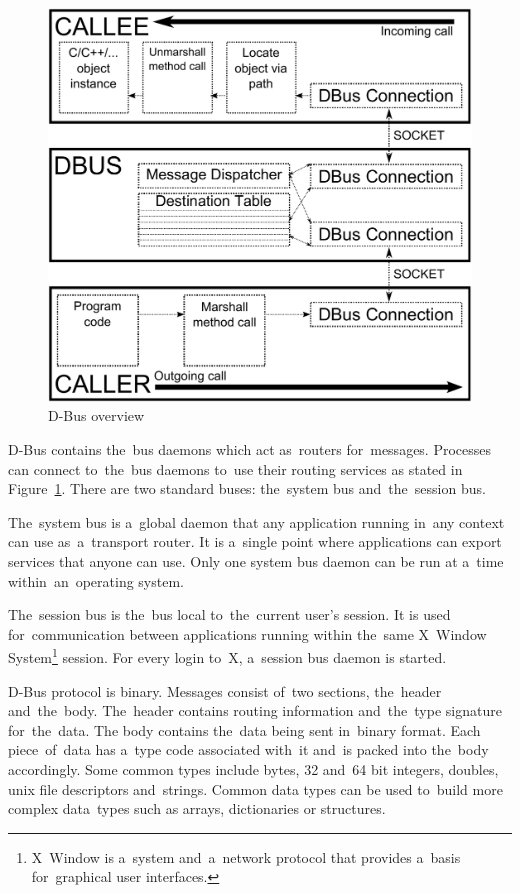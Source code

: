 \documentclass[conference]{IEEEtran}
\begin{document}
\begin{figure}[h]
\centering
\includegraphics[width=\columnwidth]{dbus_overview.pdf}
\caption{D-Bus overview}
\label{fig:dbus_image}
\end{figure}


D-Bus contains the~bus daemons which act as~routers for~messages. Processes
can connect to~the~bus daemons to~use their routing services as stated
in Figure~\ref{fig:dbus_image}. There are two standard buses:
the~system bus and~the~session bus.


The~system bus is a~global daemon that any application running in~any
context can use as~a~transport router. It is a~single point where applications
can export services that anyone can use. Only one system bus daemon
can be run at a~time within~an~operating system.


The~session bus is the~bus local to~the~current user's session. It is used
for~communication between applications running within the~same X~Window
System\footnote{X~Window is a~system and~a~network protocol that provides
a~basis for~graphical user interfaces.} session. For every login to~X,
a~session bus daemon is started.


D-Bus protocol is binary. Messages consist of~two sections, the~header
and~the~body. The~header contains routing information and~the~type signature
for~the~data. The body contains the~data being sent in~binary format. Each
piece~of~data has a~type code \mbox{associated} with~it and~is packed into the~body
accordingly. Some common types include bytes, 32 and~64 bit integers, doubles,
unix file descriptors and~strings. Common data types can be used to~build more
complex data~types such as arrays, dictionaries or structures.
\end{document}
